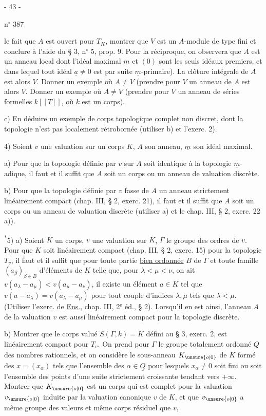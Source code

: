\begin{center}- 43 -\end{center}
\hfill n$^\circ$ 387

le fait que $A$ est ouvert pour $T_K$, montrer que $V$ est un $A$-module de type fini et conclure à l'aide du § 3, n$^\circ$ 5, prop. 9. Pour la réciproque, on observera que $A$ est un anneau local dont l'idéal maximal $\underline m$ et $(0)$ sont les seuls idéaux premiers, et dans lequel tout idéal $\underline a\ne0$ est par suite $\underline m$-primaire). La clôture intégrale de $A$ est alors $V$. Donner un exemple où $A\ne V$ (prendre pour $V$ un anneau de $A$ est alors $V$. Donner un exemple où $A\ne V$ (prendre pour $V$ un anneau de séries formelles $k[[T]]$, où $k$ est un corps).

c) En déduire un exemple de corps topologique complet non discret, dont la topologie n'est pas localement rétrobornée (utiliser b) et l'exerc. 2).

4) Soient $v$ une valuation sur un corps $K$, $A$ son anneau, $\underline m$ son idéal maximal.

a) Pour que la topologie définie par $v$ sur $A$ soit identique à la topologie $\underline m$-adique, il faut et il suffit que $A$ soit un corps ou un anneau de valuation discrète.

b) Pour que la topologie définie par $v$ fasse de $A$ un anneau strictement linéairement compact (chap. III, § 2, exerc. 21), il faut et il suffit que $A$ soit un corps ou un anneau de valuation discrète (utiliser a) et le chap. III, § 2, exerc. 22 a)).

\textsuperscript{*}5) a) Soient $K$ un corps, $v$ une valuation sur $K$, $\Gamma$ le groupe des ordres de $v$. Pour que $K$ soit linéairement compact (chap. III, § 2, exerc. 15) pour la topologie $T_v$, il faut et il suffit que pour toute partie \uline{bien ordonnée} $B$ de $\Gamma$ et toute famille $(a_\beta)_{\beta\in B}$ d'éléments de $K$ telle que, pour $\lambda<\mu<\nu$, on ait $v(a_\lambda-a_\mu)<v(a_\mu-a_\nu)$, il existe un élément $a\in K$ tel que $v(a-a_\lambda)=v(a_\lambda-a_\mu)$ pour tout couple d'indices $\lambda,\mu$ tels que $\lambda<\mu$. (Utiliser l'exerc. de \uline{Ens.}, chap. III, 2$^{\mathrm e}$ éd., § 2). Lorsqu'il en est ainsi, l'anneau $A$ de la valuation $v$ est aussi linéairement compact pour la topologie discrète.

b) Montrer que le corps valué $S(\Gamma,k)=K$ défini au § 3, exerc. 2, est linéairement compact pour $T_v$. On prend pour $\Gamma$ le groupe totalement ordonné $\underline Q$ des nombres rationnels, et on considère le sous-anneau $K_{\unsure{o|0}}$ de $K$ formé des $x=(x_\alpha)$ tels que l'ensemble des $\alpha\in\underline Q$ pour lesquels $x_\alpha\ne0$ soit fini ou soit l'ensemble des points d'une suite strictement croissante tendant vers $+\infty$. Montrer que $K_{\unsure{o|0}}$ est un corps qui est complet pour la valuation $v_{\unsure{o|0}}$ induite par la valuation canonique $v$ de $K$, et que $v_{\unsure{o|0}}$ a même groupe des valeurs et même corps résiduel que $v$,
